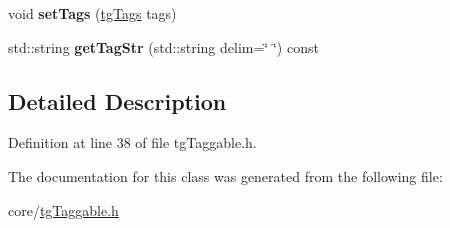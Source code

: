 \begin{DoxyCompactItemize}
\item 
\hypertarget{classtg_taggable_a5492888e4e4da4cca6261070b5726adf}{void {\bfseries set\-Tags} (\hyperlink{classtg_tags}{tg\-Tags} tags)}\label{classtg_taggable_a5492888e4e4da4cca6261070b5726adf}

\item 
\hypertarget{classtg_taggable_a346d66b066d2d9eb1eadba01da43749f}{std\-::string {\bfseries get\-Tag\-Str} (std\-::string delim=\char`\"{} \char`\"{}) const }\label{classtg_taggable_a346d66b066d2d9eb1eadba01da43749f}

\end{DoxyCompactItemize}


\subsection{Detailed Description}


Definition at line 38 of file tg\-Taggable.\-h.



The documentation for this class was generated from the following file\-:\begin{DoxyCompactItemize}
\item 
core/\hyperlink{tg_taggable_8h}{tg\-Taggable.\-h}\end{DoxyCompactItemize}
